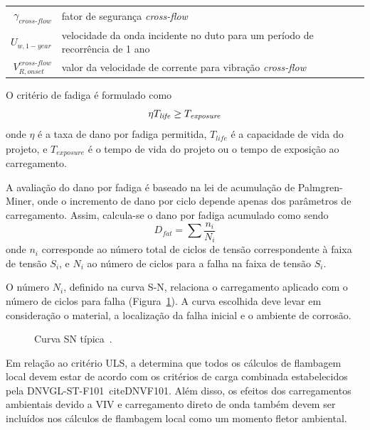 \begin{itemize}
	\begin{tabular}{rl}
		$\gamma_\mathit{\textit{cross-flow}}$               & fator de segurança \textit{cross-flow}\\
		$U_{w,1-\mathit{year}}$            & velocidade da onda incidente no duto para um período de recorrência de 1 ano\\
		$V_{R,\mathit{onset}}^\mathit{\textit{cross-flow}}$ & valor da  velocidade de corrente para vibração \textit{cross-flow}
	\end{tabular}
\end{itemize}

O critério de fadiga é formulado como
\begin{equation}
\label{eq:viv-eqfat}
\eta T_\mathit{life} \geq T_\mathit{exposure}\\
\end{equation}
onde $\eta$ é a taxa de dano por fadiga permitida, $T_\mathit{life}$ é a capacidade de vida do projeto, e
$T_\mathit{exposure}$ é o tempo de vida do projeto ou o tempo de exposição ao carregamento.

A avaliação do dano por fadiga é baseado na lei de acumulação de Palmgren-Miner, onde o incremento de dano por ciclo depende apenas dos parâmetros de carregamento.
Assim, calcula-se o dano por fadiga acumulado como sendo
\begin{equation}
\label{eq:viv-eqpm}
D_\mathit{fat} = \sum \frac{n_i}{N_i}
\end{equation}
onde $n_i$ corresponde ao número total de ciclos de tensão correspondente à faixa de tensão $S_i$, e $N_i$ ao número de ciclos para a falha na faixa de tensão $S_i$.

O número $N_i$, definido na curva S-N, relaciona o carregamento aplicado com o número de ciclos para falha (Figura~\ref{fig:viv-sncurve}).
A curva escolhida deve levar em consideração o material, a localização da falha inicial e o ambiente de corrosão.
\begin{figure}[hbt!]
\centering
\caption{Curva SN típica~\cite{DNV2017}.}
\label{fig:viv-sncurve}
\vspace{-0.7cm}
\end{figure}

\sloppy
Em relação ao critério ULS, a  determina que todos os cálculos de flambagem local devem estar de acordo com os critérios de carga combinada estabelecidos pela \mbox{DNVGL-ST-F101}~cite{DNVF101}.
Além disso, os efeitos dos carregamentos ambientais devido a VIV e carregamento direto de onda também devem ser incluídos nos cálculos de flambagem local como um momento fletor ambiental.

